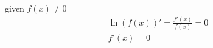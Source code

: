 \documentclass{article}
\begin{document}
  given $f(x) \neq 0$
\begin{align*}
  \ln(f(x))' = \frac{f'(x)}{f(x)} = 0\\
  f'(x) = 0
\end{align*}
\end{document}
